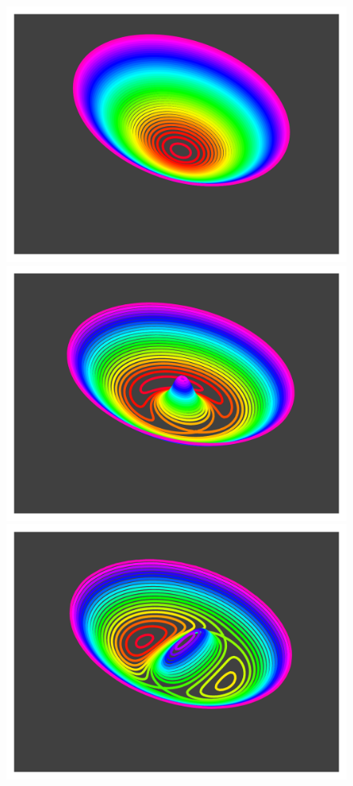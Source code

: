 \begin{figure}
\centering
\includegraphics[width=\columnwidth]{fig/arriv_0}
\includegraphics[width=\columnwidth]{fig/arriv_1}
\includegraphics[width=\columnwidth]{fig/arriv_2}

\end{figure}

